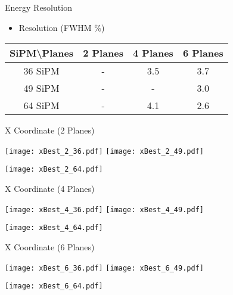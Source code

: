\documentclass{beamer}
\begin{document}
\begin{frame}{Energy Resolution}
\begin{center}
\begin{itemize}
\item Resolution (FWHM \%)
\vspace{0.5 cm}
\end{itemize}
 \begin{tabular}{c|ccc|}
  \toprule
  SiPM\textbackslash Planes & \textbf{2 Planes} & \textbf{4 Planes} & \textbf{6 Planes} \\
   \hline
  36 SiPM & - & 3.5 & 3.7 \\
  49 SiPM & - & - & 3.0 \\
  64 SiPM & - & 4.1 & 2.6 \\
    \toprule
 \end{tabular}
\end{center}
\end{frame}

\begin{frame}{X Coordinate (2 Planes)}
\begin{adjustwidth}{-1.5em}{-1.5em}
	\texttt{[image: xBest\_2\_36.pdf]}
	\texttt{[image: xBest\_2\_49.pdf]} \\
	\begin{center} {\texttt{[image: xBest\_2\_64.pdf]}} \end{center}
\end{adjustwidth}
\end{frame}

\begin{frame}{X Coordinate (4 Planes)}
\begin{adjustwidth}{-1.5em}{-1.5em}
	\texttt{[image: xBest\_4\_36.pdf]}
	\texttt{[image: xBest\_4\_49.pdf]} \\
	\begin{center} {\texttt{[image: xBest\_4\_64.pdf]}} \end{center}
\end{adjustwidth}
\end{frame}

\begin{frame}{X Coordinate (6 Planes)}
\begin{adjustwidth}{-1.5em}{-1.5em}
	\texttt{[image: xBest\_6\_36.pdf]}
	\texttt{[image: xBest\_6\_49.pdf]} \\
	\begin{center} {\texttt{[image: xBest\_6\_64.pdf]}} \end{center}
\end{adjustwidth}
\end{frame}
\end{document}
